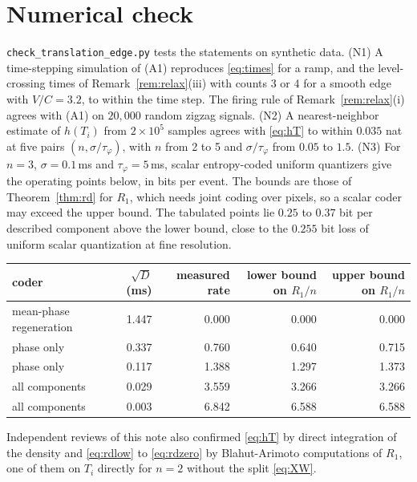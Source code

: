 \documentclass[10pt]{article}
\theoremstyle{remark}
\newcommand{\tphi}{\tau_\varphi}
\begin{document}
\section{Numerical check}
\texttt{check\_translation\_edge.py} tests the statements on synthetic data. (N1) A time-stepping
simulation of (A1) reproduces \eqref{eq:times} for a ramp, and the level-crossing times of
Remark~\ref{rem:relax}(iii) with counts 3 or 4 for a smooth edge with $V/C=3.2$, to within the time
step. The firing rule of Remark~\ref{rem:relax}(i) agrees with (A1) on $20{,}000$ random zigzag
signals. (N2) A nearest-neighbor estimate of $h(T_i)$ from $2\times10^5$ samples agrees with
\eqref{eq:hT} to within $0.035$ nat at five pairs $(n,\sigma/\tphi)$, with $n$ from 2 to 5 and
$\sigma/\tphi$ from $0.05$ to $1.5$. (N3) For $n=3$, $\sigma=0.1$\,ms and $\tphi=5$\,ms, scalar
entropy-coded uniform quantizers give the operating points below, in bits per event. The bounds
are those of Theorem~\ref{thm:rd} for $R_1$, which needs joint coding over pixels, so a scalar
coder may exceed the upper bound. The tabulated points lie $0.25$ to $0.37$ bit per described component above
the lower bound, close to the $0.255$ bit loss of uniform scalar quantization at fine resolution.
\begin{center}
\begin{tabular}{lrrrr}
\toprule
coder & $\sqrt D$ (ms) & measured rate & lower bound on $R_1/n$ & upper bound on $R_1/n$\\
\midrule
mean-phase regeneration & 1.447 & 0.000 & 0.000 & 0.000\\
phase only & 0.337 & 0.760 & 0.640 & 0.715\\
phase only & 0.117 & 1.388 & 1.297 & 1.373\\
all components & 0.029 & 3.559 & 3.266 & 3.266\\
all components & 0.003 & 6.842 & 6.588 & 6.588\\
\bottomrule
\end{tabular}
\end{center}
Independent reviews of this note also confirmed \eqref{eq:hT} by direct integration of the density
and \eqref{eq:rdlow} to \eqref{eq:rdzero} by Blahut-Arimoto computations of $R_1$, one of them on
$T_i$ directly for $n=2$ without the split \eqref{eq:XW}.
\end{document}
